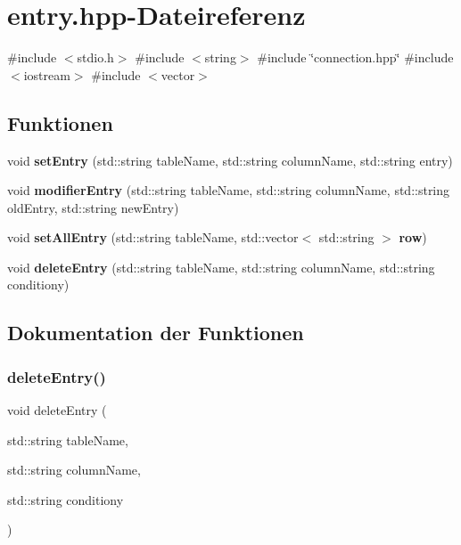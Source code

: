 \section{entry.\+hpp-\/\+Dateireferenz}
\label{entry_8hpp}
{\ttfamily \#include $<$stdio.\+h$>$}\newline
{\ttfamily \#include $<$string$>$}\newline
{\ttfamily \#include \char`\"{}connection.\+hpp\char`\"{}}\newline
{\ttfamily \#include $<$iostream$>$}\newline
{\ttfamily \#include $<$vector$>$}\newline
\subsection*{Funktionen}
\begin{DoxyCompactItemize}
\item 
void \textbf{ set\+Entry} (std\+::string table\+Name, std\+::string column\+Name, std\+::string entry)
\item 
void \textbf{ modifier\+Entry} (std\+::string table\+Name, std\+::string column\+Name, std\+::string old\+Entry, std\+::string new\+Entry)
\item 
void \textbf{ set\+All\+Entry} (std\+::string table\+Name, std\+::vector$<$ std\+::string $>$ \textbf{ row})
\item 
void \textbf{ delete\+Entry} (std\+::string table\+Name, std\+::string column\+Name, std\+::string conditiony)
\end{DoxyCompactItemize}


\subsection{Dokumentation der Funktionen}
\mbox{\label{entry_8hpp_a490d3fdb8238137f5d9f4a1fecaf2f96}} 
\subsubsection{delete\+Entry()}
{\footnotesize\ttfamily void delete\+Entry (\begin{DoxyParamCaption}\item[{std\+::string}]{table\+Name,  }\item[{std\+::string}]{column\+Name,  }\item[{std\+::string}]{conditiony }\end{DoxyParamCaption})}

